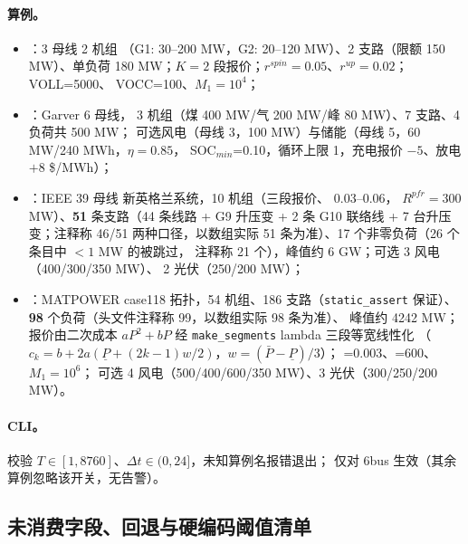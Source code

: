 \paragraph{算例。}
\begin{itemize}
  \item {}：3 母线 2 机组
        （G1: 30--200 MW，G2: 20--120 MW）、2 支路（限额 150 MW）、单负荷
        180 MW；$K=2$ 段报价；$r^{spin}=0.05$、$r^{up}=0.02$；VOLL=5000、
        VOCC=100、$M_1=10^4$；
  \item {}：Garver 6 母线，
        3 机组（煤 400 MW/气 200 MW/峰 80 MW）、7 支路、4 负荷共 500 MW；
        可选风电（母线 3，100 MW）与储能（母线 5，60 MW/240 MWh，$\eta=0.85$，
        SOC$_{min}$=0.10，循环上限 1，充电报价 $-5$、放电 $+8$ \$/MWh）；
  \item {}：IEEE 39 母线
        新英格兰系统，10 机组（三段报价、 0.03--0.06，
        $R^{pfr}=300$ MW）、\textbf{51} 条支路（44 条线路 + G9 升压变
        + 2 条 G10 联络线 + 7 台升压变；注释称 46/51 两种口径，以数组实际
        51 条为准）、17 个非零负荷（26 个条目中 $<1$ MW 的被跳过，
        注释称 21 个），峰值约 6 GW；可选 3 风电（400/300/350 MW）、
        2 光伏（250/200 MW）；
  \item {}：MATPOWER
        case118 拓扑，54 机组、186 支路（\texttt{static\_assert} 保证）、
        \textbf{98} 个负荷（头文件注释称 99，以数组实际 98 条为准）、
        峰值约 4242 MW；报价由二次成本 $aP^2+bP$ 经
        \texttt{make\_segments} lambda 三段等宽线性化
        （$c_k=b+2a(\underline P+(2k-1)w/2)$，$w=(\bar P-\underline P)/3$）；
        =0.003、=600、$M_1=10^6$；
        可选 4 风电（500/400/600/350 MW）、3 光伏（300/250/200 MW）。
\end{itemize}

\paragraph{CLI。} 校验
$T\in[1,8760]$、$\Delta t\in(0,24]$，未知算例名报错退出；
仅对 6bus 生效（其余算例忽略该开关，无告警）。

\subsection{未消费字段、回退与硬编码阈值清单}

